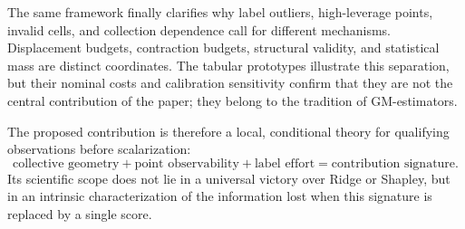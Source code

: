 The same framework finally clarifies why label outliers, high-leverage points, invalid cells, and collection dependence call for different mechanisms. Displacement budgets, contraction budgets, structural validity, and statistical mass are distinct coordinates. The tabular prototypes illustrate this separation, but their nominal costs and calibration sensitivity confirm that they are not the central contribution of the paper; they belong to the tradition of GM-estimators.

The proposed contribution is therefore a local, conditional theory for qualifying observations before scalarization:
\[
\boxed{
\text{collective geometry}
+\text{point observability}
+\text{label effort}
=\text{contribution signature}.
}
\]
Its scientific scope does not lie in a universal victory over Ridge or Shapley, but in an intrinsic characterization of the information lost when this signature is replaced by a single score.

